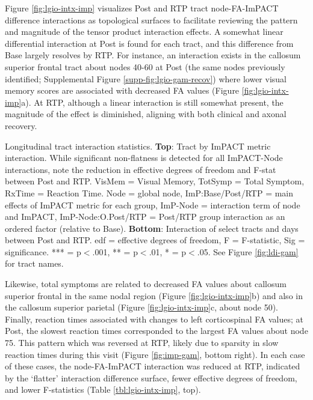\documentclass[12pt]{article}
\begin{document}
Figure \ref{fig:lgio-intx-imp} visualizes Post and RTP tract node-FA-ImPACT difference interactions as topological surfaces to facilitate reviewing the pattern and magnitude of the tensor product interaction effects. A somewhat linear differential interaction at Post is found for each tract, and this difference from Base largely resolves by RTP. For instance, an interaction exists in the callosum superior frontal tract about nodes 40-60 at Post (the same nodes previously identified; Supplemental Figure \ref{supp-fig:lgio-gam-recov}) where lower visual memory scores are associated with decreased FA values (Figure \ref{fig:lgio-intx-imp}a). At RTP, although a linear interaction is still somewhat present, the magnitude of the effect is diminished, aligning with both clinical and axonal recovery.

\begin{table}[H]
	\scriptsize
	
	\caption{Longitudinal tract interaction statistics. \textbf{Top}: Tract by ImPACT metric interaction. While significant non-flatness is detected for all ImPACT-Node interactions, note the reduction in effective degrees of freedom and F-stat between Post and RTP. VisMem = Visual Memory, TotSymp = Total Symptom, RxTime = Reaction Time. Node = global node, ImP:Base/Post/RTP = main effects of ImPACT metric for each group, ImP-Node = interaction term of node and ImPACT, ImP-Node:O.Post/RTP = Post/RTP group interaction as an ordered factor (relative to Base). \textbf{Bottom}: Interaction of select tracts and days between Post and RTP. edf = effective degrees of freedom, F = F-statistic, Sig = significance. *** = p$<$.001, ** = p$<$.01, * = p$<$.05. See Figure \ref{fig:ldi-gam} for tract names.}
	\label{tbl:lgio-intx-imp}
\end{table}

Likewise, total symptoms are related to decreased FA values about callosum superior frontal in the same nodal region (Figure \ref{fig:lgio-intx-imp}b) and also in the callosum superior parietal (Figure \ref{fig:lgio-intx-imp}c, about node 50). Finally, reaction times associated with changes to left corticospinal FA values; at Post, the slowest reaction times corresponded to the largest FA values about node 75. This pattern which was reversed at RTP, likely due to sparsity in slow reaction times during this visit (Figure \ref{fig:imp-gam}, bottom right). In each case of these cases, the node-FA-ImPACT interaction was reduced at RTP, indicated by the `flatter' interaction difference surface, fewer effective degrees of freedom, and lower F-statistics (Table \ref{tbl:lgio-intx-imp}, top).
\end{document}
